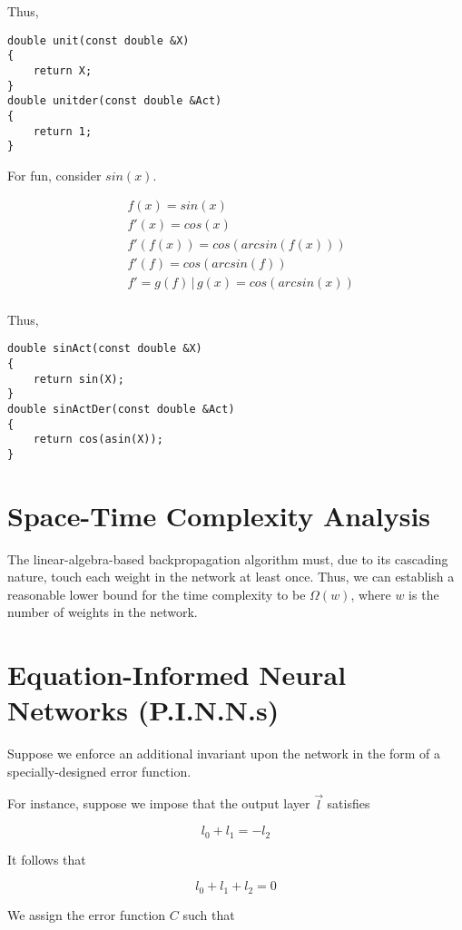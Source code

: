 \documentclass[8pt]{amsart}
\newcommand\where{\, \bigg \rvert \,}
\begin{document}
Thus,

\begin{verbatim}
double unit(const double &X)
{
    return X;
}
double unitder(const double &Act)
{
    return 1;
}
\end{verbatim}

For fun, consider $sin(x)$.

\[
    \begin{aligned}
        & f(x) = sin(x) \\
        & f'(x) = cos(x) \\
        & f'(f(x)) = cos(arcsin(f(x))) \\
        & f'(f) = cos(arcsin(f)) \\
        & f' = g(f) \where g(x) = cos(arcsin(x)) \\
    \end{aligned}
\]

Thus,

\begin{verbatim}
double sinAct(const double &X)
{
    return sin(X);
}
double sinActDer(const double &Act)
{
    return cos(asin(X));
}
\end{verbatim}

\section{Space-Time Complexity Analysis}

The linear-algebra-based backpropagation algorithm must, due to its
cascading nature, touch each weight in the network at least once. Thus,
we can establish a reasonable lower bound for the time complexity to be
$\Omega (w)$, where $w$ is the number of weights in the network.

\section{Equation-Informed Neural Networks (P.I.N.N.s)}

Suppose we enforce an additional invariant upon the network in the
form of a specially-designed error function.

For instance, suppose we impose that the output layer $\vec{l}$
satisfies

\[
    l_0 + l_1 = -l_2
\]

It follows that

\[
    l_0 + l_1 + l_2 = 0
\]

We assign the error function $C$ such that
\end{document}
